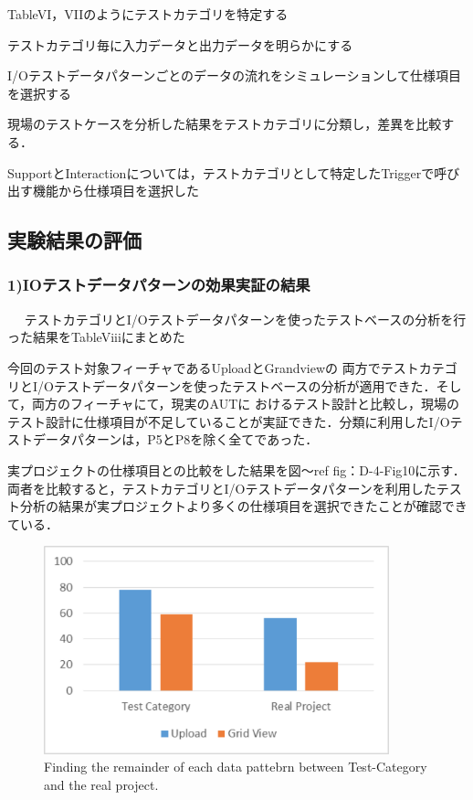 \documentclass[a4paper,11pt]{jreport}
\begin{document}
TableVI，VIIのようにテストカテゴリを特定する

テストカテゴリ毎に入力データと出力データを明らかにする

I/Oテストデータパターンごとのデータの流れをシミュレーションして仕様項目を選択する

現場のテストケースを分析した結果をテストカテゴリに分類し，差異を比較する．

SupportとInteractionについては，テストカテゴリとして特定したTriggerで呼び出す機能から仕様項目を選択した

\subsection{実験結果の評価}

\subsubsection{1)IOテストデータパターンの効果実証の結果}
　
テストカテゴリとI/Oテストデータパターンを使ったテストベースの分析を行った結果をTableViiiにまとめた

今回のテスト対象フィーチャであるUploadとGrandviewの 両方でテストカテゴリとI/Oテストデータパターンを使ったテストベースの分析が適用できた．そして，両方のフィーチャにて，現実のAUTに おけるテスト設計と比較し，現場のテスト設計に仕様項目が不足していることが実証できた．分類に利用したI/Oテストデータパターンは，P5とP8を除く全てであった．



実プロジェクトの仕様項目との比較をした結果を図〜ref {fig：D-4-Fig10}に示す．両者を比較すると，テストカテゴリとI/Oテストデータパターンを利用したテスト分析の結果が実プロジェクトより多くの仕様項目を選択できたことが確認できている．
   \begin{figure}[htbp]
  \begin{center}
  \includegraphics[width=10cm]{./image/D-4-Fig10.png}
  \caption{Finding the remainder of each data pattebrn between Test-Category and the real project.}
  \label{fig:D-4-Fig10}
  \end{center}
   \end{figure}
\end{document}
